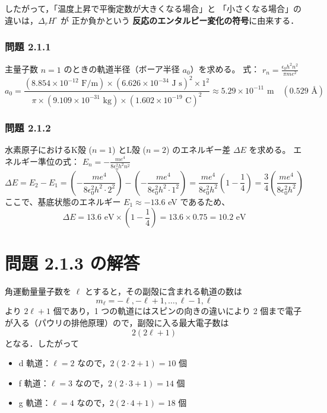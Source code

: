 \documentclass[a4paper,12pt]{jlreq}
\begin{document}
したがって，「温度上昇で平衡定数が大きくなる場合」と
「小さくなる場合」の違いは，\(\Delta_r H^\circ\) が
正か負かという \textbf{反応のエンタルピー変化の符号}に由来する．





\newpage



\subsubsection*{問題 2.1.1}
主量子数 $n=1$ のときの軌道半径（ボーア半径 $a_0$）を求める。
式： $r_n = \frac{\epsilon_0 h^2 n^2}{\pi m e^2}$
\[
a_0 = \frac{(8.854 \times 10^{-12} \text{ F/m}) \times (6.626 \times 10^{-34} \text{ J s})^2 \times 1^2}{\pi \times (9.109 \times 10^{-31} \text{ kg}) \times (1.602 \times 10^{-19} \text{ C})^2} \approx 5.29 \times 10^{-11} \text{ m} \quad (0.529\text{ \AA})
\]

\subsubsection*{問題 2.1.2}
水素原子におけるK殻 ($n=1$) とL殻 ($n=2$) のエネルギー差 $\Delta E$ を求める。
エネルギー準位の式： $E_n = -\frac{m e^4}{8 \epsilon_0^2 h^2 n^2}$
\[
\Delta E = E_2 - E_1 = \left( -\frac{m e^4}{8 \epsilon_0^2 h^2 \cdot 2^2} \right) - \left( -\frac{m e^4}{8 \epsilon_0^2 h^2 \cdot 1^2} \right) = \frac{m e^4}{8 \epsilon_0^2 h^2} \left( 1 - \frac{1}{4} \right) = \frac{3}{4} \left( \frac{m e^4}{8 \epsilon_0^2 h^2} \right)
\]
ここで、基底状態のエネルギー $E_1 \approx -13.6$ eV であるため、
\[
\Delta E = 13.6 \text{ eV} \times \left( 1 - \frac{1}{4} \right) = 13.6 \times 0.75 = 10.2 \text{ eV}
\]




\newpage



\section*{問題 2.1.3 の解答}

角運動量量子数を $\ell$ とすると，その副殻に含まれる軌道の数は
\[
m_\ell=-\ell,-\ell+1,\dots,\ell-1,\ell
\]
より $2\ell+1$ 個であり，1 つの軌道にはスピンの向きの違いにより
2 個まで電子が入る（パウリの排他原理）ので，副殻に入る最大電子数は
\[
2(2\ell+1)
\]
となる．したがって

\begin{itemize}
  \item d 軌道：$\ell=2$ なので，$2(2\cdot2+1)=10$ 個
  \item f 軌道：$\ell=3$ なので，$2(2\cdot3+1)=14$ 個
  \item g 軌道：$\ell=4$ なので，$2(2\cdot4+1)=18$ 個
\end{itemize}
\end{document}
